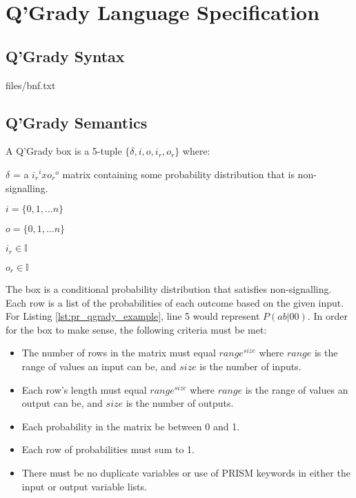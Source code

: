 \documentclass[report.tex]{subfiles}
\begin{document}
\chapter{Q'Grady Language Specification} %
\label{cha:q_grady_specification}
\section{Q'Grady Syntax} %
\label{sec:q_grady_syntax}

{files/bnf.txt} 

\section{Q'Grady Semantics} %
\label{sec:q_grady_semantics}
A Q'Grady box is a 5-tuple \(\{\delta, i, o, i_r, o_r\}\) where:

\(\delta\) = a \({i_r}^{i} x {o_r}^{o}\) matrix containing some probability 
distribution that is non-signalling. 

\(i = \{0, 1, ... n\}\)

\(o = \{0, 1, ... n\}\)

\(i_r \in \mathbb{I}\)

\(o_r \in \mathbb{I}\)

The box is a conditional probability distribution that satisfies non-signalling.
Each row is a list of the probabilities of each outcome based on the given
input. For Listing \ref{lst:pr_qgrady_example}, line 5 would represent 
\(P(ab | 00)\). In order for the box to make sense, the following criteria must
be met:
\begin{itemize}
    \item The number of rows in the matrix must equal \(range ^ {size}\) where
    \(range\) is the range of values an input can be, and \(size\) is the number
    of inputs.
    \item Each row's length must equal \(range ^{size}\) where \(range\) is
    the range of values an output can be, and \(size\) is the number of outputs.
    \item Each probability in the matrix be between 0 and 1.
    \item Each row of probabilities must sum to 1.
    \item There must be no duplicate variables or use of PRISM keywords in
    either the input or output variable lists.
\end{itemize}
\newpage
\end{document}
